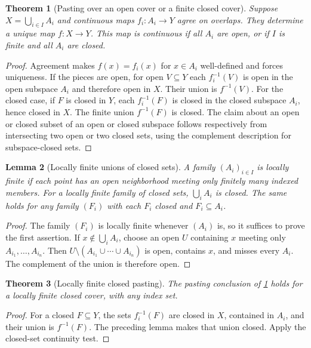 \documentclass[11pt,oneside,openany]{book}
\newtheorem{theorem}{Theorem}[chapter]
\newtheorem{lemma}[theorem]{Lemma}
\theoremstyle{definition}
\theoremstyle{remark}
\begin{document}
\begin{theorem}[Pasting over an open cover or a finite closed cover]\label{d10:02:pasting}
Suppose $X=\bigcup_{i\in I}A_i$ and continuous maps $f_i:A_i\to Y$ agree on overlaps. They determine a unique map $f:X\to Y$. This map is continuous if all $A_i$ are open, or if $I$ is finite and all $A_i$ are closed.
\end{theorem}
\begin{proof}
Agreement makes $f(x)=f_i(x)$ for $x\in A_i$ well-defined and forces uniqueness. If the pieces are open, for open $V\subseteq Y$ each $f_i^{-1}(V)$ is open in the open subspace $A_i$ and therefore open in $X$. Their union is $f^{-1}(V)$. For the closed case, if $F$ is closed in $Y$, each $f_i^{-1}(F)$ is closed in the closed subspace $A_i$, hence closed in $X$. The finite union $f^{-1}(F)$ is closed. The claim about an open or closed subset of an open or closed subspace follows respectively from intersecting two open or two closed sets, using the complement description for subspace-closed sets.
\end{proof}

\begin{lemma}[Locally finite unions of closed sets]\label{d10:02:locally-finite-closed}
A family $(A_i)_{i\in I}$ is locally finite if each point has an open neighborhood meeting only finitely many indexed members. For a locally finite family of closed sets, $\bigcup_i A_i$ is closed. The same holds for any family $(F_i)$ with each $F_i$ closed and $F_i\subseteq A_i$.
\end{lemma}
\begin{proof}
The family $(F_i)$ is locally finite whenever $(A_i)$ is, so it suffices to prove the first assertion. If $x\notin\bigcup_i A_i$, choose an open $U$ containing $x$ meeting only $A_{i_1},\ldots,A_{i_n}$. Then $U\setminus(A_{i_1}\cup\cdots\cup A_{i_n})$ is open, contains $x$, and misses every $A_i$. The complement of the union is therefore open.
\end{proof}

\begin{theorem}[Locally finite closed pasting]\label{d10:02:locally-finite-pasting}
The pasting conclusion of \cref{d10:02:pasting} holds for a locally finite closed cover, with any index set.
\end{theorem}
\begin{proof}
For a closed $F\subseteq Y$, the sets $f_i^{-1}(F)$ are closed in $X$, contained in $A_i$, and their union is $f^{-1}(F)$. The preceding lemma makes that union closed. Apply the closed-set continuity test.
\end{proof}
\end{document}
